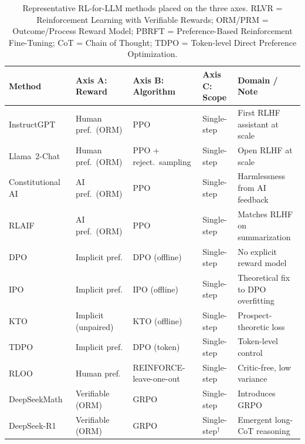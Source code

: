 \begin{table}[t]
\centering
\caption{Representative RL-for-LLM methods placed on the three axes.
RLVR = Reinforcement Learning with Verifiable Rewards;
ORM/PRM = Outcome/Process Reward Model;
PBRFT = Preference-Based Reinforcement Fine-Tuning;
CoT = Chain of Thought;
TDPO = Token-level Direct Preference Optimization.}
\label{tab:placement}
\renewcommand{\arraystretch}{1.2}
\footnotesize
\begin{tabular}{@{}llllp{}@{}}
\toprule
\textbf{Method} & \textbf{Axis A: Reward} & \textbf{Axis B: Algorithm} & \textbf{Axis C: Scope} & \textbf{Domain / Note} \\
\midrule
InstructGPT~\cite{ouyang2022instructgpt}      & Human pref.\ (ORM)        & PPO            & Single-step & First RLHF assistant at scale \\
Llama~2-Chat~\cite{touvron2023llama2}          & Human pref.\ (ORM)        & PPO + reject.\ sampling & Single-step & Open RLHF at scale \\
Constitutional AI~\cite{bai2022constitutional} & AI pref.\ (ORM)           & PPO            & Single-step & Harmlessness from AI feedback \\
RLAIF~\cite{lee2023rlaif}                       & AI pref.\ (ORM)           & PPO            & Single-step & Matches RLHF on summarization \\
DPO~\cite{rafailov2023dpo}                      & Implicit pref.            & DPO (offline)  & Single-step & No explicit reward model \\
IPO~\cite{azar2024ipo}                          & Implicit pref.            & IPO (offline)  & Single-step & Theoretical fix to DPO overfitting \\
KTO~\cite{ethayarajh2024kto}                    & Implicit (unpaired)       & KTO (offline)  & Single-step & Prospect-theoretic loss \\
TDPO~\cite{zeng2024tdpo}                         & Implicit pref.            & DPO (token)    & Single-step & Token-level control \\
RLOO~\cite{ahmadian2024rloo}                     & Human pref.               & REINFORCE-leave-one-out & Single-step & Critic-free, low variance \\
DeepSeekMath~\cite{shao2024deepseekmath}        & Verifiable (ORM)          & GRPO           & Single-step & Introduces GRPO \\
DeepSeek-R1~\cite{guo2025deepseekr1}            & Verifiable (ORM)          & GRPO           & Single-step$^\dagger$ & Emergent long-CoT reasoning \\

\end{tabular}
\end{table}
